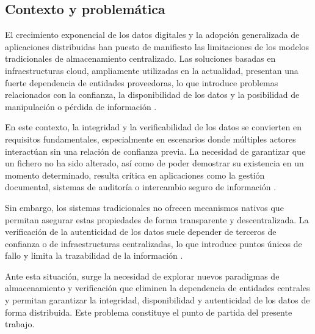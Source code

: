 \subsection{Contexto y problemática}

El crecimiento exponencial de los datos digitales y la adopción generalizada de 
aplicaciones distribuidas han puesto de manifiesto las limitaciones de los modelos 
tradicionales de almacenamiento centralizado. Las soluciones basadas en infraestructuras 
cloud, ampliamente utilizadas en la actualidad, presentan una fuerte dependencia de 
entidades proveedoras, lo que introduce problemas relacionados con la confianza, 
la disponibilidad de los datos y la posibilidad de manipulación o pérdida de 
información \cite{tanenbaum2007distributed}.

En este contexto, la integridad y la verificabilidad de los datos se convierten 
en requisitos fundamentales, especialmente en escenarios donde múltiples actores 
interactúan sin una relación de confianza previa. La necesidad de garantizar que 
un fichero no ha sido alterado, así como de poder demostrar su existencia en un 
momento determinado, resulta crítica en aplicaciones como la gestión documental, 
sistemas de auditoría o intercambio seguro de información \cite{nist2011cloud,iso27001}.

Sin embargo, los sistemas tradicionales no ofrecen mecanismos nativos 
que permitan asegurar estas propiedades de forma transparente y descentralizada. 
La verificación de la autenticidad de los datos suele depender de terceros 
de confianza o de infraestructuras centralizadas, lo que introduce puntos 
únicos de fallo y limita la trazabilidad de la 
información \cite{tanenbaum2007distributed}.

Ante esta situación, surge la necesidad de explorar nuevos paradigmas de 
almacenamiento y verificación que eliminen la dependencia de entidades centrales y 
permitan garantizar la integridad, disponibilidad y autenticidad de los datos de 
forma distribuida. Este problema constituye el punto de partida del presente trabajo.